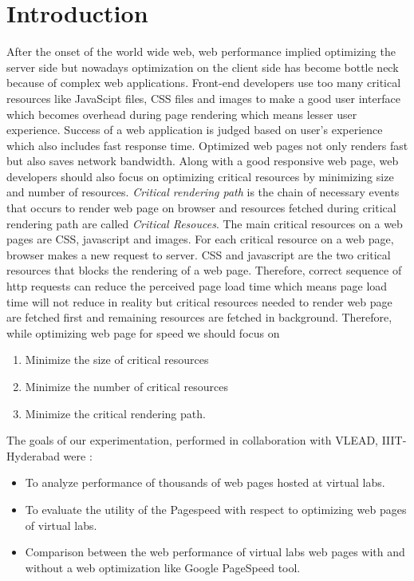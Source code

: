 \documentclass[conference]{IEEEtran}
\begin{document}
\section{Introduction}\label{sec-2}
After the onset of the world wide web, web performance implied optimizing the server side but nowadays
optimization on the client side has become bottle neck because of complex web
applications. Front-end developers use too many critical resources like
JavaScipt files, CSS files and images to make a good user interface which becomes
overhead during page rendering which means lesser user experience. Success of a web
application is judged based on user's experience which also includes fast response
time. Optimized web pages not only renders fast but also saves network
bandwidth. Along with a good responsive web page, web developers should
also focus on optimizing critical resources by minimizing size and number of resources.
{\it Critical rendering path} is the chain of necessary events that
occurs to render web page on browser and resources fetched during critical rendering path are called 
{\it Critical Resouces}\cite{crp}. The main critical resources on a web
pages are CSS, javascript and images. For each critical resource on a
web page, browser makes a new request to server. CSS and javascript are the two
critical resources that blocks the rendering of a web page. Therefore, correct
sequence of http requests can reduce the perceived page load time which means page
load time will not reduce in reality but critical resources needed to render web page are
fetched first and remaining resources are fetched in background. Therefore,
while optimizing web page for speed we should focus on \cite{crpo}
\begin{enumerate}
 \item Minimize the size of critical resources
 \item Minimize the number of critical resources
 \item Minimize the critical rendering path.
\end{enumerate}

The goals of our experimentation, performed in collaboration with VLEAD,
IIIT-Hyderabad were :

\begin{itemize}
\item To analyze performance of thousands of web pages hosted at virtual labs.
\item To evaluate the utility of the Pagespeed with respect to optimizing web pages of virtual labs.
\item Comparison between the web performance of virtual labs web pages with
and without a web optimization like Google PageSpeed tool.
\end{itemize}
\end{document}
